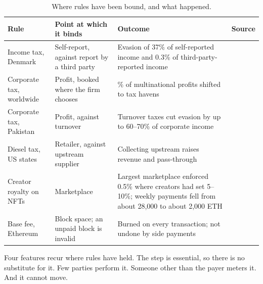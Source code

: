 \begin{table}[t]
\centering
\caption{Where rules have been bound, and what happened.}
\label{tab:evidence}
\small
\renewcommand{\arraystretch}{1.22}
\begin{tabular}{@{}>{\raggedright\arraybackslash}p{}>{\raggedright\arraybackslash}p{}>{\raggedright\arraybackslash}p{}>{\raggedright\arraybackslash}p{}@{}}
\toprule
Rule & Point at which it binds & Outcome & Source\\
\midrule
Income tax, Denmark & Self-report, against report by a third party & Evasion of 37\% of
self-reported income and 0.3\% of third-party-reported income & \citet{KlevenEtAl2011}\\
Corporate tax, worldwide & Profit, booked where the firm chooses & 36\% of multinational
profits shifted to tax havens & \citet{TorslovWierZucman2023}\\
Corporate tax, Pakistan & Profit, against turnover & Turnover taxes cut evasion by up to
60--70\% of corporate income & \citet{BestEtAl2015}\\
Diesel tax, US states & Retailer, against upstream supplier & Collecting upstream raises
revenue and pass-through & \citet{KopczukEtAl2016}\\
Creator royalty on NFTs & Marketplace & Largest marketplace enforced 0.5\% where creators
had set 5--10\%; weekly payments fell from about 28,000 to about 2,000 ETH &
\citet{Akers2023}\\
Base fee, Ethereum & Block space; an unpaid block is invalid & Burned on every
transaction; not undone by side payments & \citet{Roughgarden2021}\\
\bottomrule
\end{tabular}
\end{table}

Four features recur where rules have held. The step is essential, so there is no
substitute for it. Few parties perform it. Someone other than the payer meters it. And it
cannot move.

